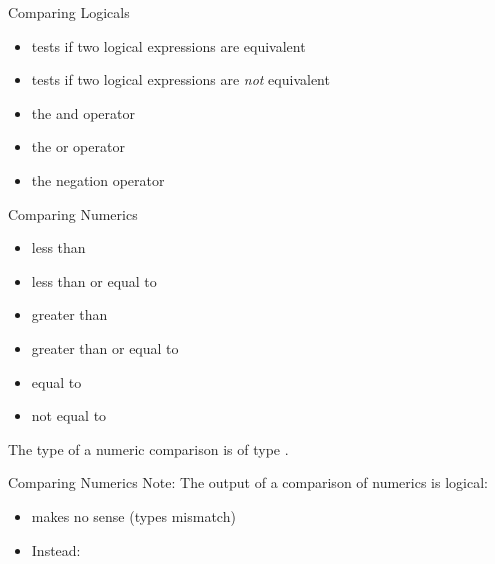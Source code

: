 \begin{frame}
  \begin{block}{Comparing Logicals}\pause
  \begin{itemize}
    \item {} {tests if two logical expressions are equivalent}
    \item {} {tests if two logical expressions are \emph{not} equivalent}
    \item {} {the and operator}
    \item {} {the or operator}
    \item {} {the negation operator}
  \end{itemize}
  \end{block}
\end{frame}

\begin{frame}
  \begin{block}{Comparing Numerics}\pause
  \begin{itemize}
    \item {} { less than }
    \item {} { less than or equal to }
    \item {} { greater than }
    \item {} { greater than or equal to }
    \item {} { equal to }
    \item {} { not equal to }
  \end{itemize}
  The type of a numeric comparison is of type .
  \end{block}
\end{frame}

\begin{frame}
  \begin{block}{Comparing Numerics}\pause
  Note: The output of a comparison of numerics is logical:
  \begin{itemize}
    \item {} makes no sense (types mismatch)
    \item Instead: 
  \end{itemize}
  \end{block}
\end{frame}

